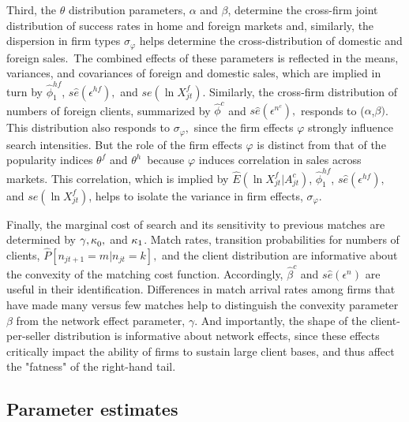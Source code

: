 Third, the $\theta $ distribution parameters, $\alpha $ and $\beta $,
determine the cross-firm joint distribution of success rates in home and
foreign markets and, similarly, the dispersion in firm types $\sigma
_{\varphi }$ helps determine the cross-distribution of domestic and foreign
sales.\ The combined effects of these parameters is reflected in the means,
variances, and covariances of foreign and domestic sales, which are implied
in turn by $\widehat{\phi }_{1}^{hf}$, $s\widehat{e}(\epsilon ^{hf}),$ and $%
se(\ln X_{jt}^{f}).$ Similarly, the cross-firm distribution of numbers of
foreign clients, summarized by $\widehat{\phi }^{c}$ and $s\widehat{e}%
(\epsilon ^{n^{c}}),$ responds to ($\alpha $,$\beta )$. This distribution
also responds to $\sigma _{\varphi },$ since the firm effects $\varphi $
strongly influence search intensities. But the role of the firm effects $%
\varphi $ is distinct from that of the popularity indices $\theta ^{f}$ and $%
\theta ^{h}$\ because $\varphi $ induces correlation in sales across
markets. This correlation, which is implied by $\widehat{E}(\ln
X_{jt}^{f}|A_{jt}^{c})$, $\widehat{\phi }_{1}^{hf}$, $s\widehat{e}(\epsilon
^{hf}),$ and $se(\ln X_{jt}^{f})$, helps to isolate the variance in firm
effects, $\sigma _{\varphi }.$

Finally, the marginal cost of search and its sensitivity to previous matches
are determined by ${\normalsize \gamma ,\kappa }_{0}{\normalsize ,}$ and $%
{\normalsize \kappa }_{1}$. Match rates, transition probabilities for
numbers of clients, $\widehat{P}[n_{jt+1}=m|n_{jt}=k],$ and the client
distribution are informative about the convexity of the matching cost
function. Accordingly, $\widehat{\beta }^{c}$ and $s\widehat{e}(\epsilon
^{n})$ are useful in their identification. Differences in match arrival
rates among firms that have made many versus few matches help to distinguish
the convexity parameter $\beta $ from the network effect parameter, $\gamma
. $ And importantly, the shape of the client-per-seller distribution is
informative about network effects, since these effects critically impact the
ability of firms to sustain large client bases, and thus affect the
"fatness" of the right-hand tail.

\subsection{Parameter estimates}

